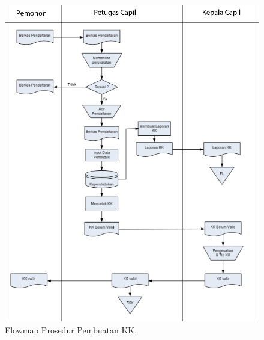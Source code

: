 \begin{enumerate}
	\begin{figure}[H]
		\centering
		\includegraphics[width=16cm]{figures/flowmap.jpg}
		\caption{Flowmap Prosedur Pembuatan KK.}	
	\end{figure}
\end{enumerate}
